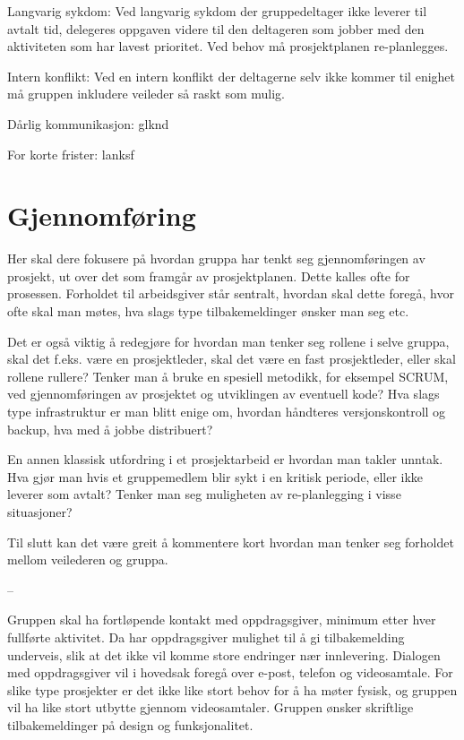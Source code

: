 \documentclass[11pt,a4paper]{report}
\begin{document}
Langvarig sykdom: Ved langvarig sykdom der gruppedeltager ikke leverer til avtalt tid, delegeres oppgaven videre til den deltageren som jobber med den aktiviteten som har lavest prioritet. Ved behov må prosjektplanen re-planlegges.

Intern konflikt: Ved en intern konflikt der deltagerne selv ikke kommer til enighet må gruppen inkludere veileder så raskt som mulig.

Dårlig kommunikasjon:  glknd

For korte frister: lanksf

\section*{Gjennomføring}

Her skal dere  fokusere på hvordan gruppa har tenkt seg gjennomføringen av prosjekt, ut over det som framgår av prosjektplanen. Dette kalles ofte for prosessen. Forholdet til arbeidsgiver står sentralt, hvordan skal dette foregå, hvor ofte skal man møtes, hva slags type tilbakemeldinger ønsker man seg etc.

Det er også viktig å redegjøre for hvordan man tenker seg rollene i selve gruppa, skal det f.eks. være en prosjektleder, skal det være en fast prosjektleder, eller skal rollene rullere? Tenker man å bruke en spesiell metodikk, for eksempel SCRUM, ved gjennomføringen av prosjektet og utviklingen av eventuell kode? Hva slags type infrastruktur er man blitt enige om, hvordan håndteres versjonskontroll og backup, hva med å jobbe distribuert?

En annen klassisk utfordring i et prosjektarbeid er hvordan man takler unntak. Hva gjør man hvis et gruppemedlem blir sykt i en kritisk periode, eller ikke leverer som avtalt? Tenker man seg muligheten av re-planlegging i visse situasjoner?

Til slutt kan det være greit å kommentere kort hvordan man tenker seg forholdet mellom veilederen og gruppa. 

--

Gruppen skal ha fortløpende kontakt med oppdragsgiver, minimum etter hver fullførte aktivitet. Da har oppdragsgiver mulighet til å gi tilbakemelding underveis, slik at det ikke vil komme store endringer nær innlevering. Dialogen med oppdragsgiver vil i hovedsak foregå over e-post, telefon og videosamtale. For slike type prosjekter er det ikke like stort behov for å ha møter fysisk, og gruppen vil ha like stort utbytte gjennom videosamtaler. Gruppen ønsker skriftlige tilbakemeldinger på design og funksjonalitet. 
\end{document}
